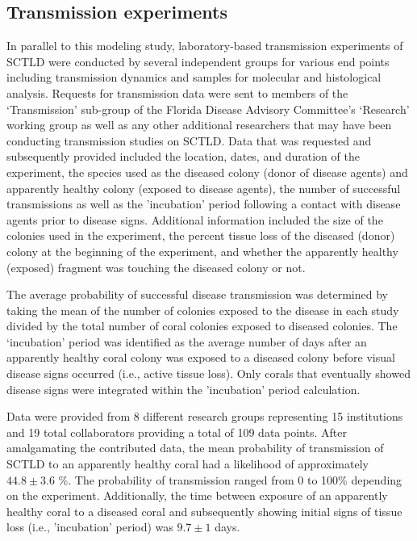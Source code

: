 \subsection{Transmission experiments}\label{sec:transmission}
In parallel to this modeling study, laboratory-based transmission experiments of SCTLD were conducted by several independent groups for various end points including transmission dynamics and samples for molecular and histological analysis. Requests for transmission data were sent to members of the ‘Transmission’ sub-group of the Florida Disease Advisory Committee’s ‘Research’ working group as well as any other additional researchers that may have been conducting transmission studies on SCTLD. Data that was requested and subsequently provided included the location, dates, and duration of the experiment, the species used as the diseased colony (donor of disease agents) and apparently healthy colony (exposed to disease agents), the number of successful transmissions as well as the 'incubation' period following a contact with disease agents prior to disease signs. Additional information included the size of the colonies used in the experiment, the percent tissue loss of the diseased (donor) colony at the beginning of the experiment, and whether the apparently healthy (exposed) fragment was touching the diseased colony or not. 

The average probability of successful disease transmission was determined by taking the mean of the number of colonies exposed to the disease in each study divided by the total number of coral colonies exposed to diseased colonies. The ‘incubation’ period was identified as the average number of days after an apparently healthy coral colony was exposed to a diseased colony before visual disease signs occurred (i.e., active tissue loss). Only corals that eventually showed disease signs were integrated within the 'incubation' period calculation. 

Data were provided from 8 different research groups representing 15 institutions and 19 total collaborators providing a total of 109 data points. After amalgamating the contributed data, the mean probability of transmission of SCTLD to an apparently healthy coral had a likelihood of approximately $44.8 \pm 3.6$ \%. The probability of transmission ranged from 0 to 100\% depending on the experiment. Additionally, the time between exposure of an apparently healthy coral to a diseased coral and subsequently showing initial signs of tissue loss (i.e., 'incubation' period) was $9.7 \pm 1$ days.  

